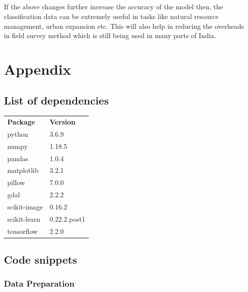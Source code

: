 \documentclass[12pt, a4paper]{report}
\begin{document}
\paragraph{}
If the above changes further increase the  accuracy of the model then, the classification data can be extremely useful in tasks like natural resource management, urban expansion etc. This will also help in reducing the overheads in field survey method which is still being used in many parts of India.


\chapter*{Appendix}
\section*{List of dependencies}
\begin{tabular}{p{} p{}}
\textbf{Package} & \textbf{Version}\\
python & 3.6.9\\
numpy & 1.18.5\\
pandas & 1.0.4\\
matplotlib & 3.2.1\\
pillow & 7.0.0\\
gdal & 2.2.2\\
scikit-image & 0.16.2\\
scikit-learn & 0.22.2.post1\\
tensorflow & 2.2.0\\
\end{tabular}

\section*{Code snippets}
\subsection*{Data Preparation}
\end{document}
